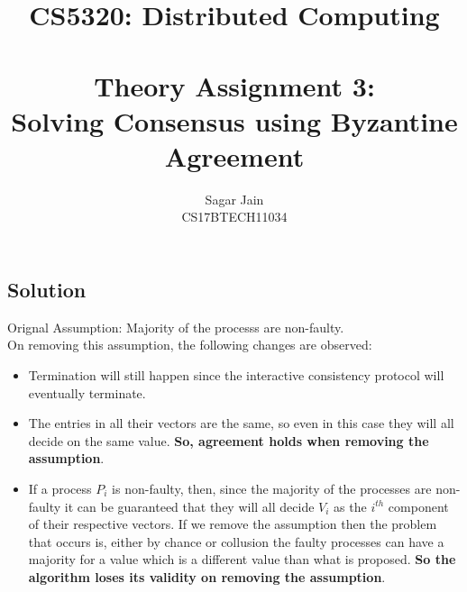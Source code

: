 \documentclass[12pt]{article}
\begin{document}
\title{CS5320: Distributed Computing\\~\\Theory Assignment 3:\\Solving Consensus using
Byzantine Agreement}
\author{Sagar Jain\\CS17BTECH11034}
\date{}
\maketitle

\subsection*{Solution}
Orignal Assumption: Majority of the processs are non-faulty.\\

On removing this assumption, the following changes are observed:
\begin{itemize}
\item  Termination will still happen since the interactive consistency protocol will eventually terminate. 
\item The entries in all their vectors are the same, so even in this case they will all decide on the same value. \textbf{So, agreement holds when removing the assumption}.
\item If a process $P_i$ is non-faulty, then, since the majority of the processes are non-faulty it can be guaranteed that they will all decide $V_i$ as the $i^{th}$ component of their respective vectors. If we remove the assumption then the problem that occurs is, either by chance or collusion the faulty processes can have a majority for a value which is a different value than what is proposed. \textbf{So the algorithm loses its validity on removing the assumption}.
\end{itemize}
\end{document}
